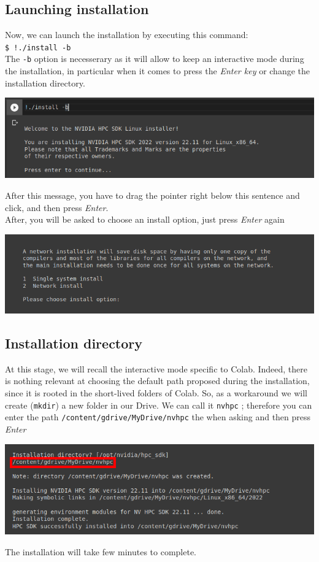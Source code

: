 \documentclass[10pt,a4paper]{article}
\newcommand{\code}[1]{\colorbox{light-gray}{\texttt{#1}}}
\begin{document}
\subsection{Launching installation}
Now, we can launch the installation by executing this command:\\
\code{\$ !./install -b}\\
The \code{-b} option is necesserary as it will allow to keep an interactive mode during the installation, in particular when it comes to press the \textit{Enter key} or change the installation directory.
\begin{center}
\includegraphics[scale=0.4]{install_1.png}
\end{center}
After this message, you have to drag the pointer right below this sentence and click, and then press \textit{Enter}.\\
After, you will be asked to choose an install option, just press \textit{Enter} again
\begin{center}
\includegraphics[scale=0.4]{install_2.png}
\end{center}

\subsection{Installation directory}
At this stage, we will recall the interactive mode specific to Colab. Indeed, there is nothing relevant at choosing the default path proposed during the installation, since it is rooted in the short-lived folders of Colab. So, as a workaround we will create (\code{mkdir}) a new folder in our Drive. We can call it \code{nvhpc} ; therefore you can  enter the path \code{/content/gdrive/MyDrive/nvhpc} the when asking and then press \textit{Enter}
\begin{center}
\includegraphics[scale=0.4]{install_3.png}
\end{center}
The installation will take few minutes to complete.
\end{document}
